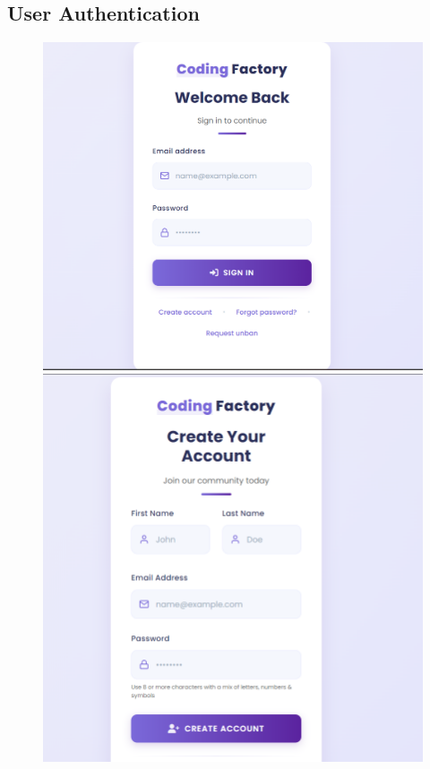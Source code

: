\documentclass[12pt,a4paper]{report}
\begin{document}
\subsection{User Authentication}

\begin{figure}[!htbp]
\centering
\begin{minipage}{0.45\textwidth}
    \centering
    \includegraphics[width=\textwidth]{media/signin.png}
\end{minipage}
\hfill
\begin{minipage}{0.45\textwidth}
    \centering
    \includegraphics[width=\textwidth]{media/create account.png}
\end{minipage}


\end{figure}
\end{document}
